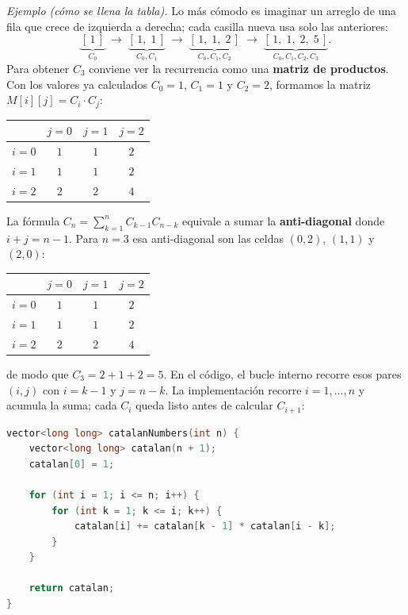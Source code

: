 \textit{Ejemplo (cómo se llena la tabla).} Lo más cómodo es imaginar un arreglo de una fila que crece de izquierda a derecha; cada casilla nueva usa solo las anteriores:
\[
\underbrace{[\,1\,]}_{C_0}
\;\to\;
\underbrace{[\,1,\;1\,]}_{C_0,C_1}
\;\to\;
\underbrace{[\,1,\;1,\;2\,]}_{C_0,C_1,C_2}
\;\to\;
\underbrace{[\,1,\;1,\;2,\;5\,]}_{C_0,C_1,C_2,C_3}.
\]
Para obtener $C_3$ conviene ver la recurrencia como una \textbf{matriz de productos}. Con los valores ya calculados $C_0=1$, $C_1=1$ y $C_2=2$, formamos la matriz $M[i][j]=C_i\cdot C_j$:
\begin{center}
\footnotesize
\renewcommand{\arraystretch}{1.15}
\begin{tabular}{c|ccc}
 & $j=0$ & $j=1$ & $j=2$ \\
\hline
$i=0$ & $1$ & $1$ & $2$ \\
$i=1$ & $1$ & $1$ & $2$ \\
$i=2$ & $2$ & $2$ & $4$ \\
\end{tabular}
\end{center}
La fórmula $C_n=\sum_{k=1}^{n} C_{k-1}C_{n-k}$ equivale a sumar la \textbf{anti-diagonal} donde $i+j=n-1$. Para $n=3$ esa anti-diagonal son las celdas $(0,2)$, $(1,1)$ y $(2,0)$:
\begin{center}
\footnotesize
\renewcommand{\arraystretch}{1.15}
\begin{tabular}{c|ccc}
 & $j=0$ & $j=1$ & $j=2$ \\
\hline
$i=0$ & $1$ & $1$ & \cellcolor{teal!20}$2$ \\
$i=1$ & $1$ & \cellcolor{teal!20}$1$ & $2$ \\
$i=2$ & \cellcolor{teal!20}$2$ & $2$ & $4$ \\
\end{tabular}
\end{center}
\noindent de modo que $C_3 = 2+1+2 = 5$. En el código, el bucle interno recorre esos pares $(i,j)$ con $i=k-1$ y $j=n-k$.
La implementación recorre $i=1,\ldots,n$ y acumula la suma; cada $C_i$ queda listo antes de calcular $C_{i+1}$:
\begin{lstlisting}[language=C++]
vector<long long> catalanNumbers(int n) {
    vector<long long> catalan(n + 1);
    catalan[0] = 1;

    for (int i = 1; i <= n; i++) {
        for (int k = 1; k <= i; k++) {
            catalan[i] += catalan[k - 1] * catalan[i - k];
        }
    }

    return catalan;
}
\end{lstlisting}

